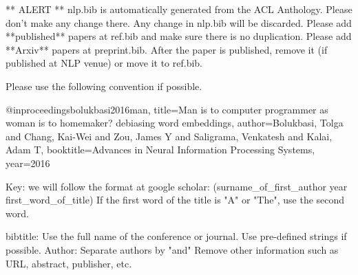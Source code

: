 ** ALERT ** nlp.bib is automatically generated from the ACL Anthology. Please don't make any change there. Any change in nlp.bib will be discarded. 
Please add **published** papers at ref.bib and make sure there is no duplication. 
Please add **Arxiv** papers at preprint.bib. After the paper is published, remove it (if published at NLP venue) or move it to ref.bib. 

Please use the following convention if possible.

@inproceedings{bolukbasi2016man,
  title={Man is to computer programmer as woman is to homemaker? debiasing word embeddings},
  author={Bolukbasi, Tolga and Chang, Kai-Wei and Zou, James Y and Saligrama, Venkatesh and Kalai, Adam T},
  booktitle={Advances in Neural Information Processing Systems},
  year={2016}
}

Key: we will follow the format at google scholar: (surname_of_first_author year first_word_of_title) If the first word of the title is "A" or "The", use the second word. 

bibtitle: Use the full name of the conference or journal. Use pre-defined strings if possible. 
Author: Separate authors by "and"
Remove other information such as URL, abstract, publisher, etc. 


